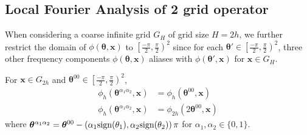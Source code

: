 \documentclass[12pt]{article}
\begin{document}
\subsection{Local Fourier Analysis of 2 grid operator}



When considering a coarse infinite grid $G_H$ of grid size $H = 2h$, we further restrict the domain of $\phi(\boldsymbol{\theta}, \mathbf{x})$ to $\left[\frac{-\pi}{2}, \frac{\pi}{2}\right)^2$ since for each $\boldsymbol{\theta}' \in \left[\frac{-\pi}{2}, \frac{\pi}{2}\right)^2$, three other frequency components $\phi(\boldsymbol{\theta}, \mathbf{x})$ aliases with $\phi(\boldsymbol{\theta}', \mathbf{x})$ for  $ \mathbf{x} \in G_H$. 
\begin{lemma} \label{th:aliasing}
    For $\mathbf{x} \in G_{2h}$ and $\boldsymbol{\theta}^{00} \in \left[\frac{-\pi}{2}, \frac{\pi}{2}\right)^2$,
    \begin{align*}
        \phi_h(\boldsymbol{\theta}^{\alpha_1\alpha_2}, \mathbf{x}) &= \phi_h(\boldsymbol{\theta}^{00}, \mathbf{x}) \\
        \phi_{h}(\boldsymbol{\theta}^{\alpha_1\alpha_2}, \mathbf{x}) &= \phi_{2h}(2\boldsymbol{\theta}^{00}, \mathbf{x})
    \end{align*}
    where $\boldsymbol{\theta}^{\alpha_1\alpha_2} = \boldsymbol{\theta}^{00} - \left(\alpha_1 \text{sign} (\theta_1), \alpha_2 \text{sign} (\theta_2)\right)\pi$ for $\alpha_1, \alpha_2 \in \{0, 1\}$. 
\end{lemma}
\end{document}

